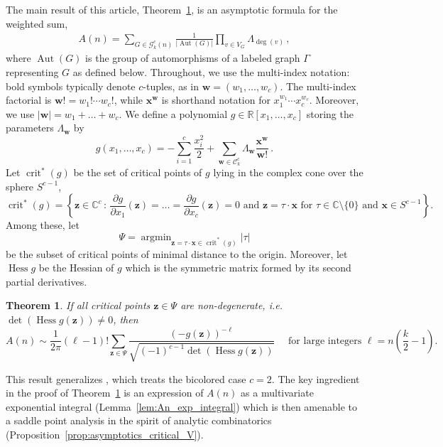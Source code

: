\documentclass[a4paper,oneside]{amsart}
\newcommand{\bb}[1]{\boldsymbol{#1}}
\newtheorem{theorem}{Theorem}
\numberwithin{theorem}{section}
\theoremstyle{remark}
\DeclareMathOperator{\argmin}{argmin}
\newcommand{\R}{\mathbb{R}}
\newcommand{\C}{\mathbb{C}}
\DeclareMathOperator{\crit}{crit}
\DeclareMathOperator{\Aut}{Aut}
\DeclareMathOperator{\Hess}{Hess}
\begin{document}
The main result of this article, Theorem~\ref{thm:main}, is an asymptotic formula for the weighted sum, 
\begin{align}
\label{eq:AnDef}
A(n) =
\sum_{G \in \mathcal G_k^c(n)}
\frac{1}
{|\Aut(G)|}\prod_{v\in V_G} \Lambda_{\deg(v)}\, ,
\end{align}
where $\Aut(G)$ is the group of automorphisms of a labeled graph $\Gamma$ representing $G$ as defined below. 
Throughout, we use the multi-index notation: bold symbols typically denote $c$-tuples, as in $\bb{w} = (w_1,\dots,w_c)$. The multi-index factorial is $\bb{w}! = w_1!\cdots w_c!$, while $\bb{x}^{\bb{w}}$ is shorthand notation for $x_1^{w_1} \cdots x_c^{w_c}$. Moreover, we use $|\bb{w}| = w_1+\dots +w_c$. We define a polynomial $g\in \R[x_1,\ldots,x_c]$ storing the parameters $\Lambda_{\bb w}$ by
\begin{equation}\label{eq:poly_g}
g(x_1,\ldots,x_c) = 
-\sum_{i=1}^c \frac{x_i^2}{2} +
\sum_{\bb w\in\mathcal C_k^c
}
\Lambda_{\bb w}
\frac{\bb x^{\bb w}}{\bb w!}\, .
\end{equation}
Let $\crit^*(g)$ be the set of critical points of $g$ lying in the complex cone over the sphere $S^{c-1}$,
\[
\crit^*(g) = \left\{ \bb{z} \in \C^c \,:\, \frac{\partial g}{\partial x_1}(\bb{z}) =\ldots = \frac{\partial g}{\partial x_c}(\bb{z}) = 0 \text{ and } \bb{z} = \tau \cdot \bb x \text{ for } \tau \in \C\setminus\{0\} \text{ and } \bb x \in S^{c-1} \right\} .
\]
Among these, let 
\[
  \Psi = \argmin_{\bb z= \tau \cdot \bb x \in \crit^*(g)} |\tau|
\] 
be the subset of critical points of minimal distance to the origin.
Moreover, let $\Hess g$ be the Hessian of $g$ which is the symmetric matrix formed by its second partial derivatives.

\begin{theorem}
  \label{thm:main}
  If all critical points $\bb{z}\in \Psi$ are non-degenerate, i.e.\ $\det (\Hess g(\bb{z}))\neq 0$, then
  \begin{equation}
    \label{eq:main_asymptotic}
    A(n) \sim \frac{1}{2\pi} (\ell-1)! \sum_{\bb{z}\in\Psi} \frac{(-g(\bb{z}))^{-\ell}}{\sqrt{(-1)^{c-1}\det (\Hess g(\bb{z}))}} 
\quad \text{ for large integers } \ell = n\left(\frac{k}{2}-1\right).
  \end{equation}
\end{theorem}
This result generalizes \cite[Theorem 5.3]{BMW24:Bicolored}, which treats the bicolored case $c=2$. The key ingredient in the proof of Theorem~\ref{thm:main} is an expression of $A(n)$ as a multivariate exponential integral (Lemma~\ref{lem:An_exp_integral}) which is then amenable to a saddle point analysis in the spirit of analytic combinatorics (Proposition~\ref{prop:asymptotics_critical_V}).
\end{document}
